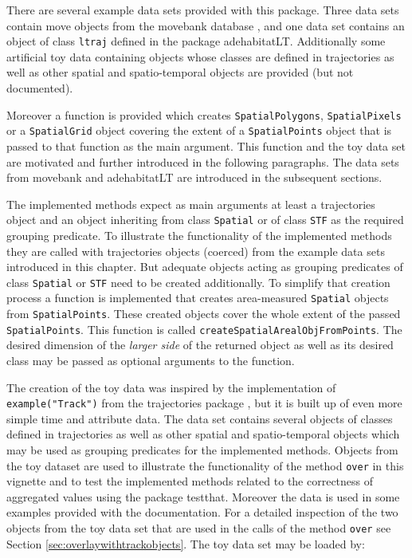 \documentclass[12pt, oneside, a4paper]{scrbook}
\newcommand{\pkg}[1]{{\normalfont\fontseries{b}\selectfont #1}}
\let\code=\texttt
\newcommand{\codeintitles}[1]{{\tt #1}} %
\begin{document}
There are several example data sets provided with this package. 
Three data sets contain \pkg{move} objects from the movebank database \citep{wikelski_movebank:_2011}, and one data set contains an object of class \code{ltraj} defined in the package \pkg{adehabitatLT}. 
Additionally some artificial toy data containing objects whose classes are defined in \pkg{trajectories} as well as other spatial and spatio-temporal objects are provided (but not documented). 
\par\medskip

Moreover a function is provided which creates \code{SpatialPolygons}, \code{SpatialPixels} or a \code{SpatialGrid} object covering the extent of a \code{SpatialPoints} object that is passed to that function as the main argument.
This function and the toy data set are motivated and further introduced in the following paragraphs. The data sets from movebank and \pkg{adehabitatLT} are introduced in the subsequent sections.
\par\medskip

\minisec{Creation of \codeintitles{Spatial} grouping predicates}

The implemented methods expect as main arguments at least a \pkg{trajectories} object and an object inheriting from class \code{Spatial} or of class \code{STF} as the required grouping predicate. To illustrate the functionality of the implemented methods they are called with \pkg{trajectories} objects (coerced) from the example data sets introduced in this chapter. But adequate objects acting as grouping predicates of class \code{Spatial} or \code{STF} need to be created additionally. To simplify that creation process a function is implemented that creates area-measured \code{Spatial} objects from \code{SpatialPoints}. These created objects cover the whole extent of the passed \code{SpatialPoints}. This function is called \code{createSpatialArealObjFromPoints}. The desired dimension of the \textit{larger side} of the returned object as well as its desired class may be passed as optional arguments to the function.
\par\medskip


The creation of the toy data was inspired by the implementation of \code{example("Track")} from the \pkg{trajectories} package \citep{klus_analysing_2014}, but it is built up of even more simple time and attribute data.
The data set contains several objects of classes defined in \pkg{trajectories} as well as other spatial and spatio-temporal objects which may be used as grouping predicates for the implemented methods. 
Objects from the toy dataset are used to illustrate the functionality of the method \code{over} in this vignette and to test the implemented methods related to the correctness of aggregated values using the package \pkg{testthat}. Moreover the data is used in some examples provided with the documentation.
For a detailed inspection of the two objects from the toy data set that are used in the calls of the method \code{over} see Section \ref{sec:overlaywithtrackobjects}.
The toy data set may be loaded by:
\par\medskip
\end{document}
